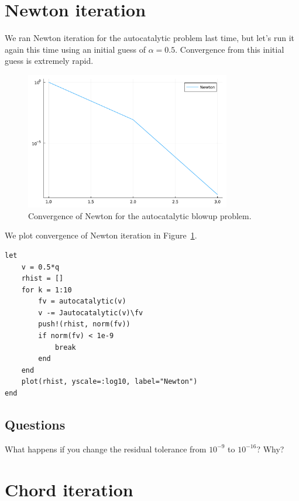 \documentclass[12pt, leqno]{article} %
\begin{document}
\section{Newton iteration}

We ran Newton iteration for the autocatalytic problem last time, but
let's run it again this time using an initial guess of \(\alpha = 0.5\).
Convergence from this initial guess is extremely rapid.

\begin{figure}
\begin{center}
  \includegraphics[width=0.8\textwidth]{fig/2023-04-12-newton.pdf}
\end{center}
\caption{Convergence of Newton for the autocatalytic blowup problem.}
\label{fig:newton-cvg}
\end{figure}

We plot convergence of Newton iteration in Figure~\ref{fig:newton-cvg}.

\begin{verbatim}
let
    v = 0.5*q
    rhist = []
    for k = 1:10
    	fv = autocatalytic(v)
    	v -= Jautocatalytic(v)\fv
    	push!(rhist, norm(fv))
    	if norm(fv) < 1e-9
            break
    	end
    end
    plot(rhist, yscale=:log10, label="Newton")
end
\end{verbatim}

\subsection{Questions}

What happens if you change the residual tolerance from \(10^{-9}\) to
\(10^{-16}\)? Why?

\section{Chord iteration}
\end{document}
